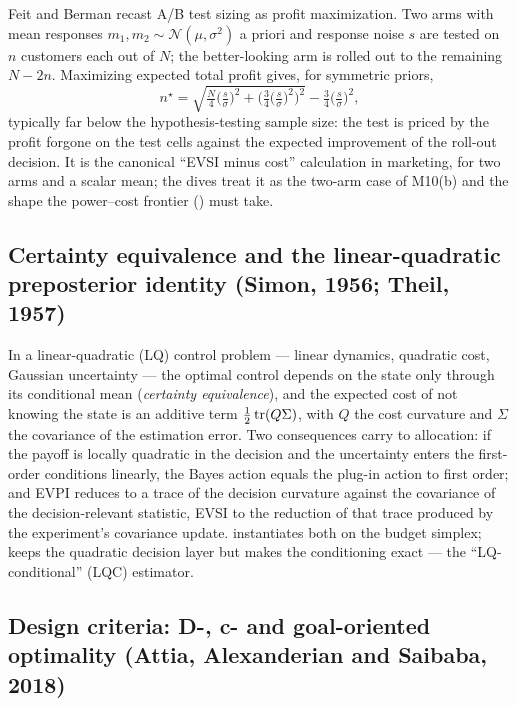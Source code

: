 Feit and Berman recast A/B test sizing as profit maximization. Two arms with mean responses $m_1, m_2 \sim \mathcal N(\mu, \sigma^2)$ a priori and response noise $s$ are tested on $n$ customers each out of $N$; the better-looking arm is rolled out to the remaining $N - 2n$. Maximizing expected total profit gives, for symmetric priors,
\begin{equation}
n^\star = \sqrt{\tfrac{N}{4}\Big(\tfrac{s}{\sigma}\Big)^2 + \Big(\tfrac{3}{4}\Big(\tfrac{s}{\sigma}\Big)^2\Big)^2} - \tfrac34\Big(\tfrac{s}{\sigma}\Big)^2,
\label{voi:eq:testroll}
\end{equation}
typically far below the hypothesis-testing sample size: the test is priced by the profit forgone on the test cells against the expected improvement of the roll-out decision. It is the canonical ``EVSI minus cost'' calculation in marketing, for two arms and a scalar mean; the dives treat it as the two-arm case of M10(b) and the shape the power--cost frontier () must take.

\subsection{Certainty equivalence and the linear-quadratic preposterior identity (Simon, 1956; Theil, 1957)}

In a linear-quadratic (LQ) control problem --- linear dynamics, quadratic cost, Gaussian uncertainty --- the optimal control depends on the state only through its conditional mean (\emph{certainty equivalence}), and the expected cost of not knowing the state is an additive term $\tfrac12\operatorname{tr}(Q\Sigma)$, with $Q$ the cost curvature and $\Sigma$ the covariance of the estimation error. Two consequences carry to allocation: if the payoff is locally quadratic in the decision and the uncertainty enters the first-order conditions linearly, the Bayes action equals the plug-in action to first order; and EVPI reduces to a trace of the decision curvature against the covariance of the decision-relevant statistic, EVSI to the reduction of that trace produced by the experiment's covariance update.  instantiates both on the budget simplex;  keeps the quadratic decision layer but makes the conditioning exact --- the ``LQ-conditional'' (LQC) estimator.

\subsection{Design criteria: D-, c- and goal-oriented optimality (Attia, Alexanderian and Saibaba, 2018)}

